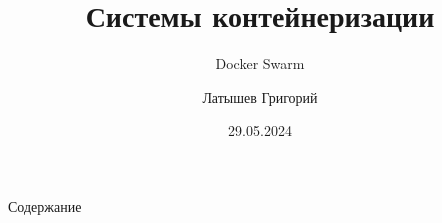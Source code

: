 \documentclass[
	10pt,
	xcolor=x11names,
	aspectratio=169,
]{beamer}
\title{Системы контейнеризации}
\subtitle{Docker Swarm}
\author{Латышев Григорий}
\date{29.05.2024}
\begin{document}
\frame[plain]{\titlepage}

\begin{frame}{Содержание}
	\tableofcontents
\end{frame}





\end{document}
